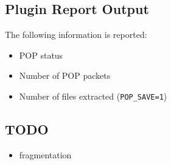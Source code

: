 \documentclass[documentation]{subfiles}
\begin{document}
\subsection{Plugin Report Output}
The following information is reported:
\begin{itemize}
    \item POP status
    \item Number of POP packets
    \item Number of files extracted ({\tt POP\_SAVE=1})
\end{itemize}

\subsection{TODO}

\begin{itemize}
    \item fragmentation
\end{itemize}
\end{document}
